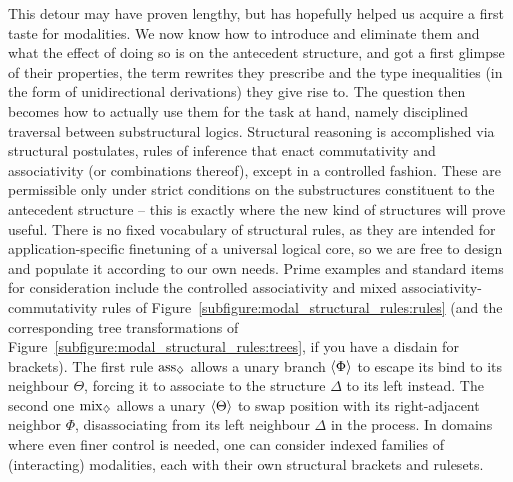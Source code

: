 This detour may have proven lengthy, but has hopefully helped us acquire a first taste for modalities.
We now know how to introduce and eliminate them and what the effect of doing so is on the antecedent structure, and got a first glimpse of their properties, the term rewrites they prescribe and the type inequalities (in the form of unidirectional derivations) they give rise to.
The question then becomes how to actually use them for the task at hand, namely disciplined traversal between substructural logics.
Structural reasoning is accomplished via structural postulates, rules of inference that enact commutativity and associativity (or combinations thereof), except in a controlled fashion.
These are permissible only under strict conditions on the substructures constituent to the antecedent structure -- this is exactly where the new kind of structures will prove useful.
There is no fixed vocabulary of structural rules, as they are intended for application-specific finetuning of a universal logical core, so we are free to design and populate it according to our own needs.
Prime examples and standard items for consideration include the controlled associativity and mixed associativity-commutativity rules of Figure~\ref{subfigure:modal_structural_rules:rules} (and the corresponding tree transformations of Figure~\ref{subfigure:modal_structural_rules:trees}, if you have a disdain for brackets).
The first rule $\rulestyle{ass}_{\diamond}$ allows a unary branch $\langle{\Phi}\rangle$ to escape its bind to its neighbour $\Theta$, forcing it to associate to the structure $\Delta$ to its left instead.
The second one $\rulestyle{mix}_{\diamond}$ allows a unary $\langle{\Theta}\rangle$ to swap position with its right-adjacent neighbor $\Phi$, disassociating from its left neighbour $\Delta$ in the process.
In domains where even finer control is needed, one can consider indexed families of (interacting) modalities, each with their own structural brackets and rulesets.

